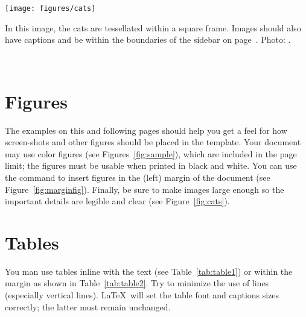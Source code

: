 \documentclass{sigchi-ext}
\begin{document}
    
    \begin{marginfigure}[-45pc]
      \begin{minipage}{\marginparwidth}
        \centering
        \texttt{[image: figures/cats]}
        \caption{In this image, the cats are tessellated within a square
          frame. Images should also have captions and be within the
          boundaries of the sidebar on page~\pageref{sec:sidebar}. Photo:
          \cczero.}~\label{fig:marginfig}
      \end{minipage}
    \end{marginfigure}
    
    \section{Figures}
    The examples on this and following pages should help you get a feel
    for how screen-shots and other figures should be placed in the
    template. Your document may use color figures (see
    Figures~\ref{fig:sample}), which are included in the page limit; the
    figures must be usable when printed in black and white. You can use
    the \texttt{\marginpar} command to insert figures in the (left) margin
    of the document (see Figure~\ref{fig:marginfig}). Finally, be sure to
    make images large enough so the important details are legible and
    clear (see Figure~\ref{fig:cats}).
    
    \section{Tables}
    You man use tables inline with the text (see Table~\ref{tab:table1})
    or within the margin as shown in Table~\ref{tab:table2}. Try to
    minimize the use of lines (especially vertical lines). \LaTeX\ will
    set the table font and captions sizes correctly; the latter must
    remain unchanged.
    
\end{document}
